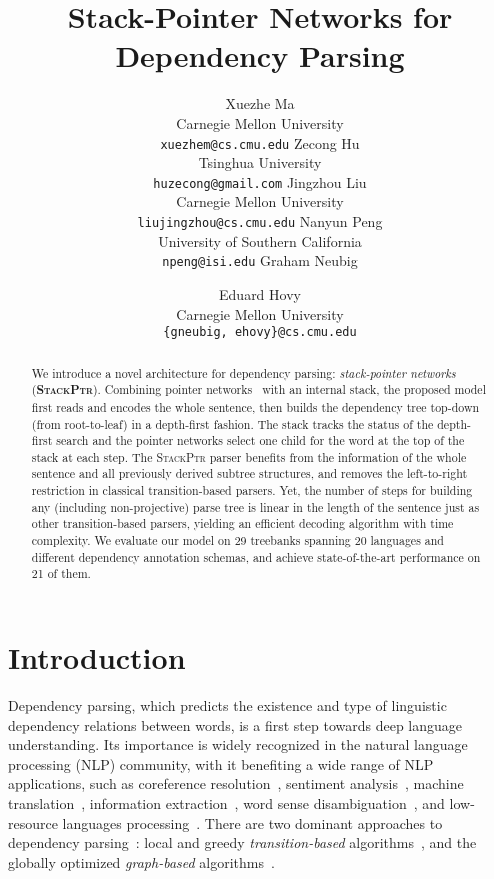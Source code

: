 \documentclass[11pt,a4paper]{article}
\title{Stack-Pointer Networks for Dependency Parsing}
\author{
Xuezhe Ma \\ Carnegie Mellon University \\ {\tt xuezhem@cs.cmu.edu}
\And Zecong Hu\Thanks{Work done while at Carnegie Mellon University.} \\ Tsinghua University \\ {\tt huzecong@gmail.com}
\And Jingzhou Liu \\ Carnegie Mellon University \\ {\tt liujingzhou@cs.cmu.edu}
\AND 
Nanyun Peng \\ University of Southern California \\ {\tt npeng@isi.edu} 
\And Graham Neubig \and Eduard Hovy \\ Carnegie Mellon University \\ {\tt \{gneubig, ehovy\}@cs.cmu.edu}
}
\date{}
\begin{document}
\maketitle

\begin{abstract}
We introduce a novel architecture for dependency parsing: \emph{stack-pointer networks} (\textbf{\textsc{StackPtr}}). 
Combining pointer networks~\citep{vinyals2015pointer} with an internal stack, the proposed model first reads and encodes the whole sentence, then builds the dependency tree top-down (from root-to-leaf) in a depth-first fashion. 
The stack tracks the status of the depth-first search and the pointer networks select one child for the word at the top of the stack at each step. 
The \textsc{StackPtr} parser benefits from the information of the whole sentence and all previously derived subtree structures, and removes the left-to-right restriction in classical transition-based parsers.
Yet, the number of steps for building any (including non-projective) parse tree is linear in the length of the sentence just as other transition-based parsers, yielding an efficient decoding algorithm with  time complexity. 
We evaluate our model on 29 treebanks spanning 20 languages and different dependency annotation schemas, and achieve state-of-the-art performance on 21 of them.
\end{abstract}

\section{Introduction}
\label{sec:intro}
Dependency parsing, which predicts the existence and type of linguistic dependency relations between words, is a first step towards deep language understanding. Its importance is widely recognized in the natural language processing (NLP) community, with it benefiting a wide range of NLP applications, such as coreference resolution~\citep{ng:2010:ACL,durrett-klein:2013:EMNLP,ma-hovy:2016:NAACL}, sentiment analysis~\citep{tai-socher-manning:2015:ACL-IJCNLP}, machine translation~\citep{bastings-EtAl:2017:EMNLP2017}, information extraction~\citep{nguyen:2009:EMNLP,angeli:2015:ACL,peng2017cross}, 
word sense disambiguation~\citep{fauceglia-EtAl:2015:EVENTS}, and low-resource languages processing~\citep{mcdonald-EtAl:2013:Short,ma-xia:2014:P14-1}.
There are two dominant approaches to dependency parsing~\citep{Buchholz:2006,nivre:CoNLL2007}: local and greedy \emph{transition-based} algorithms~\citep{yamada2003statistical,Nivre:2004,zhang-nivre:2011,chen-manning:EMNLP2014},  and the globally optimized \emph{graph-based} algorithms~\citep{eisner1996three,McDonald:2005,McDonald:2005b,Koo:2010}.
\end{document}
